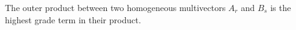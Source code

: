 \begin{definition}\label{d:outer-product1}
	The outer product between two homogeneous multivectors $A_r$ and $B_s$ is the highest grade term in their product.
\end{definition}
